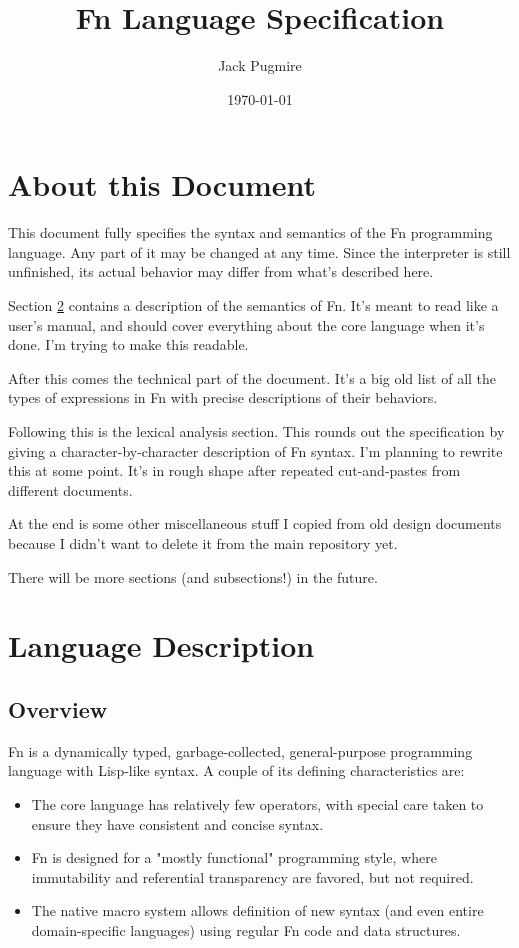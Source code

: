 \documentclass[11pt]{article}
\author{Jack Pugmire}
\date{\today}
\title{Fn Language Specification}
\begin{document}
\maketitle
\tableofcontents


\section{About this Document}
\label{sec:orge8c6f6a}

This document fully specifies the syntax and semantics of the Fn programming
language. Any part of it may be changed at any time. Since the interpreter is
still unfinished, its actual behavior may differ from what's described here.

Section \ref{sec:orgbc0d4fa} contains a description of the semantics of Fn. It's
meant to read like a user's manual, and should cover everything about the core
language when it's done. I'm trying to make this readable.

After this comes the technical part of the document. It's a big old list of all
the types of expressions in Fn with precise descriptions of their behaviors.

Following this is the lexical analysis section. This rounds out the
specification by giving a character-by-character description of Fn syntax. I'm
planning to rewrite this at some point. It's in rough shape after repeated
cut-and-pastes from different documents.

At the end is some other miscellaneous stuff I copied from old design documents
because I didn't want to delete it from the main repository yet.

There will be more sections (and subsections!) in the future.


\section{Language Description}
\label{sec:orgbc0d4fa}

\subsection{Overview}
\label{sec:org91300c7}

Fn is a dynamically typed, garbage-collected, general-purpose programming
language with Lisp-like syntax. A couple of its defining characteristics are:
\begin{itemize}
\item The core language has relatively few operators, with special care taken to
ensure they have consistent and concise syntax.
\item Fn is designed for a "mostly functional" programming style, where immutability
and referential transparency are favored, but not required.
\item The native macro system allows definition of new syntax (and even entire
domain-specific languages) using regular Fn code and data structures.
\end{itemize}
\end{document}
